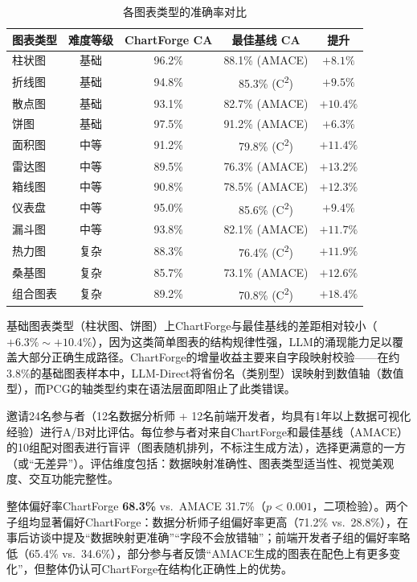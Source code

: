 \begin{table}[H]
\centering
\caption{各图表类型的准确率对比}
\label{tab:fine_grained}
\begin{tabular}{l|c|c|c|c}
\toprule
\textbf{图表类型} & \textbf{难度等级} & \textbf{ChartForge CA} & \textbf{最佳基线 CA} & \textbf{提升} \\
\midrule
柱状图 & 基础 & 96.2\% & 88.1\% (AMACE) & $+8.1\%$ \\
折线图 & 基础 & 94.8\% & 85.3\% (C\textsuperscript{2}) & $+9.5\%$ \\
散点图 & 基础 & 93.1\% & 82.7\% (AMACE) & $+10.4\%$ \\
饼图   & 基础 & 97.5\% & 91.2\% (AMACE) & $+6.3\%$ \\
\hline
面积图 & 中等 & 91.2\% & 79.8\% (C\textsuperscript{2}) & $+11.4\%$ \\
雷达图 & 中等 & 89.5\% & 76.3\% (AMACE) & $+13.2\%$ \\
箱线图 & 中等 & 90.8\% & 78.5\% (AMACE) & $+12.3\%$ \\
仪表盘 & 中等 & 95.0\% & 85.6\% (C\textsuperscript{2}) & $+9.4\%$ \\
漏斗图 & 中等 & 93.8\% & 82.1\% (AMACE) & $+11.7\%$ \\
\hline
热力图 & 复杂 & 88.3\% & 76.4\% (C\textsuperscript{2}) & $+11.9\%$ \\
桑基图 & 复杂 & 85.7\% & 73.1\% (AMACE) & $+12.6\%$ \\
组合图表 & 复杂 & 89.2\% & 70.8\% (C\textsuperscript{2}) & $+18.4\%$ \\
\bottomrule
\end{tabular}
\end{table}

基础图表类型（柱状图、饼图）上ChartForge与最佳基线的差距相对较小（$+6.3\%\sim+10.4\%$），因为这类简单图表的结构规律性强，LLM的涌现能力足以覆盖大部分正确生成路径。ChartForge的增量收益主要来自字段映射校验——在约3.8\%的基础图表样本中，LLM-Direct将省份名（类别型）误映射到数值轴（数值型），而PCG的轴类型约束在语法层面即阻止了此类错误。

邀请24名参与者（12名数据分析师 + 12名前端开发者，均具有1年以上数据可视化经验）进行A/B对比评估。每位参与者对来自ChartForge和最佳基线（AMACE）的10组配对图表进行盲评（图表随机排列，不标注生成方法），选择更满意的一方（或“无差异”）。评估维度包括：数据映射准确性、图表类型适当性、视觉美观度、交互功能完整性。

整体偏好率ChartForge \textbf{68.3\%} vs.\ AMACE 31.7\%（$p < 0.001$，二项检验）。两个子组均显著偏好ChartForge：数据分析师子组偏好率更高（71.2\% vs.\ 28.8\%），在事后访谈中提及“数据映射更准确”“字段不会放错轴”；前端开发者子组的偏好率略低（65.4\% vs.\ 34.6\%），部分参与者反馈“AMACE生成的图表在配色上有更多变化”，但整体仍认可ChartForge在结构化正确性上的优势。

